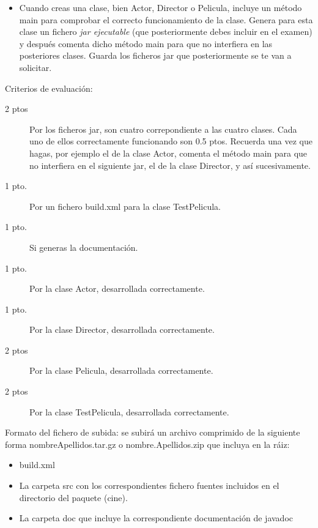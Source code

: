 \documentclass[addpoints,12pt]{exam}
\begin{document}
\begin{questions}
\begin{itemize}
\item Cuando creas una clase, bien Actor, Director o Pelicula, incluye un método main para comprobar el correcto funcionamiento de la clase. Genera para esta clase un fichero \emph{jar ejecutable} (que posteriormente debes incluir en el examen) y después comenta dicho método main para que no interfiera en las posteriores clases. Guarda los ficheros jar que posteriormente se te van a solicitar.
\end{itemize}
Criterios de evaluación:
\begin{description}
\item[2 ptos] Por los ficheros jar, son cuatro correpondiente a las cuatro clases. Cada uno de ellos correctamente funcionando son 0.5 ptos. Recuerda una vez que hagas, por ejemplo el de la clase Actor, comenta el método main para que no interfiera en el siguiente jar, el de la clase Director, y así sucesivamente.
\item[1 pto.] Por un fichero build.xml para la clase TestPelicula.
\item[1 pto.] Si generas la documentación.
\item[1 pto.] Por la clase Actor, desarrollada correctamente.
\item[1 pto.] Por la clase Director, desarrollada correctamente.
\item[2 ptos] Por la clase Pelicula, desarrollada correctamente.
\item[2 ptos] Por la clase TestPelicula, desarrollada correctamente.
\end{description}
Formato del fichero de subida: se subirá un archivo comprimido de la siguiente forma nombreApellidos.tar.gz o nombre.Apellidos.zip que incluya en la ráiz:
\begin{itemize}
\item build.xml
\item La carpeta src con los correspondientes fichero fuentes incluidos en el directorio del paquete (cine).
\item La carpeta doc que incluye la correspondiente documentación de javadoc
\end{itemize}
\end{questions}
\end{document}
